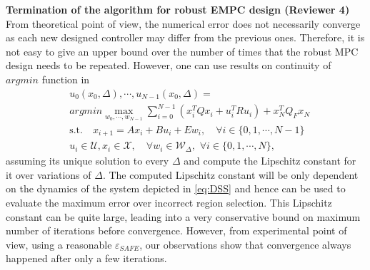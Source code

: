{\textbf{Termination of the algorithm for robust EMPC design (Reviewer 4)}\\
From theoretical point of view, the numerical error does not necessarily converge as each new designed controller may differ from the previous ones. Therefore, it is not easy to give an upper bound over the number of times that the robust MPC design needs to be repeated. However, one can use results on continuity of $argmin$ function in 
\begin{align*}
\label{eq:argmin}
&u_0(x_0,\Delta),\cdots,u_{N-1}(x_0,\Delta)=\\
&argmin \max_{w_0,\cdots,w_{N-1}} \sum_{i=0}^{N-1}(x_i^TQx_i+u_i^TRu_i) + x_N^TQ_Fx_N\nonumber\\
&\text{s.t.} \quad x_{i+1}=Ax_i+Bu_i + E w_i, \quad\forall i\in\{0,1,\cdots,N-1\}\nonumber\\
&u_i\in\mathcal{U},x_i\in\mathcal{X},\quad \forall w_i\in\mathcal{W}_{\Delta},\,\,\forall i\in\{0,1,\cdots,N\},
\end{align*}
 assuming its unique solution to every $\Delta$ and compute the Lipschitz constant for it over variations of $\Delta$. The computed Lipschitz constant will be only dependent on the dynamics of the system depicted in \autoref{eq:DSS} and hence can be used to evaluate the maximum error over incorrect region selection. This Lipschitz constant can be quite large, leading into a very conservative bound on maximum number of iterations before convergence. However, from experimental point of view, using a reasonable $\varepsilon_{SAFE}$, our observations show that convergence always happened after only a few iterations.
}
